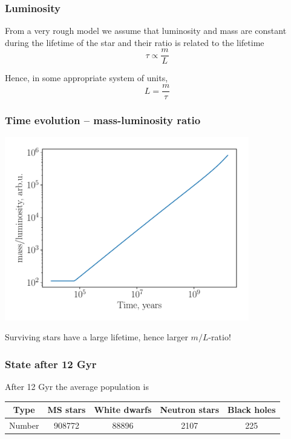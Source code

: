 \documentclass{beamer}
\begin{document}
\begin{frame}
\frametitle{Luminosity}
From a very rough model we assume that luminosity and mass are constant
during the lifetime of the star and their ratio is related to the lifetime
\begin{equation*}
\tau\propto \frac{m}{L}
\end{equation*}

Hence, in some appropriate system of units,
\begin{equation*}
L = \frac{m}{\tau}
\end{equation*}
\end{frame}

\begin{frame}
\frametitle{Time evolution -- mass-luminosity ratio}
\includegraphics[width=0.8\textwidth]{lm.pdf}

Surviving stars have a large lifetime, hence larger $m/L$-ratio!
\end{frame}



\begin{frame}
\frametitle{State after 12 Gyr}
After 12 Gyr the average population is

\begin{tabular}{c|cccc}
Type & MS stars & White dwarfs & Neutron stars & Black holes\\
\hline
Number & 908772 & 88896 & 2107 & 225
\end{tabular}
\end{frame}
\end{document}
